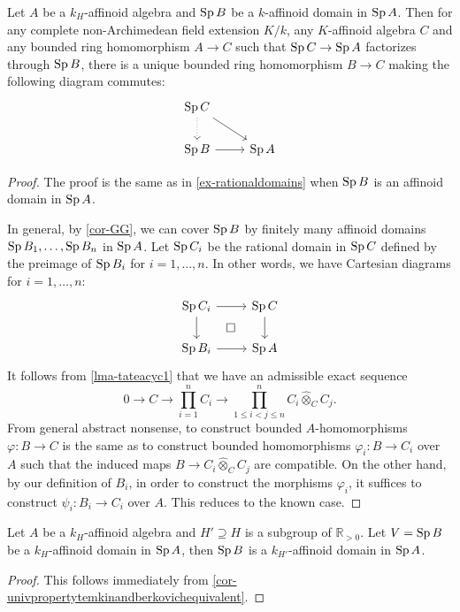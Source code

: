 \begin{corollary}\label{cor-univpropertytemkinandberkovichequivalent}
    Let $A$ be a $k_H$-affinoid algebra and $\operatorname{Sp} B$ be a $k$-affinoid domain in $\operatorname{Sp} A$. Then for any complete non-Archimedean field extension $K/k$, any $K$-affinoid algebra $C$ and any bounded ring homomorphism $A\rightarrow C$ such that $\operatorname{Sp} C\rightarrow \operatorname{Sp} A$ factorizes through $\operatorname{Sp} B$, there is a unique bounded ring homomorphism $B\rightarrow C$ making the following diagram commutes:
    \[
    \begin{tikzcd}
        \Sp C \arrow[rd] \arrow[d, dotted] &       \\
        \Sp B \arrow[r]                    & \Sp A
    \end{tikzcd}
    \]
\end{corollary}
\begin{proof}
    The proof is the same as in \cref{ex-rationaldomains} when $\operatorname{Sp} B$ is an affinoid domain in $\operatorname{Sp} A$. 

    In general, by \cref{cor-GG}, we can cover $\operatorname{Sp} B$ by finitely many affinoid domains $\operatorname{Sp} B_1,\ldots,\operatorname{Sp} B_n$ in $\operatorname{Sp} A$. Let $\operatorname{Sp} C_i$ be the rational domain in $\operatorname{Sp} C$ defined by the preimage of $\operatorname{Sp} B_i$ for $i=1,\ldots,n$. In other words, we have Cartesian diagrams for $i=1,\ldots,n$:
    \[
        \begin{tikzcd}
            \Sp C_i \arrow[r] \arrow[d] \arrow[rd, "\square", phantom] & \Sp C \arrow[d] \\
            \Sp B_i \arrow[r]                                          & \Sp A          
        \end{tikzcd}  
    \]
    It follows from \cref{lma-tateacyc1} that we have an admissible exact sequence
    \[
        0\rightarrow C\rightarrow \prod_{i=1}^n C_i\rightarrow \prod_{1\leq i<j\leq n}^n C_{i}\hat{\otimes}_C C_j.    
    \] 
    From general abstract nonsense, to construct bounded $A$-homomorphisms $\varphi:B\rightarrow C$ is the same as to construct bounded homomorphisms $\varphi_i:B\rightarrow C_i$ over $A$ such that the induced maps $B\rightarrow C_{i}\hat{\otimes}_C C_j$ are compatible. On the other hand, by our definition of $B_i$, in order to construct the morphisms $\varphi_i$, it suffices to construct $\psi_i:B_i\rightarrow C_i$ over $A$. This reduces to the known case. 
\end{proof}


\begin{corollary}
    Let $A$ be a $k_H$-affinoid algebra and $H'\supseteq H$ is a subgroup of $\mathbb{R}_{>0}$. Let $V=\operatorname{Sp} B$ be a $k_H$-affinoid domain in $\operatorname{Sp} A$, then $\operatorname{Sp} B$ is a $k_{H'}$-affinoid domain in $\operatorname{Sp} A$.
\end{corollary}
\begin{proof}
    This follows immediately from \cref{cor-univpropertytemkinandberkovichequivalent}.
\end{proof}

